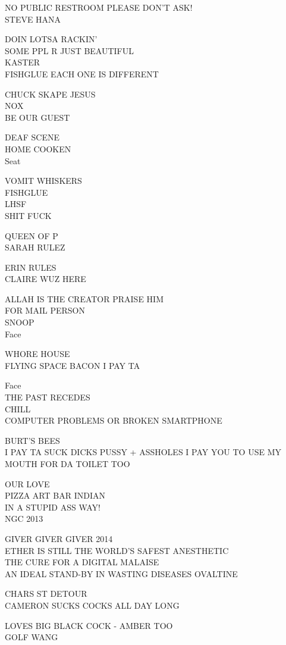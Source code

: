 \documentclass[10pt,letterpaper]{article}
\begin{document}
NO PUBLIC RESTROOM PLEASE DON'T ASK!\\
STEVE HANA

DOIN LOTSA RACKIN'\\
SOME PPL R JUST BEAUTIFUL\\
KASTER\\
FISHGLUE EACH ONE IS DIFFERENT

CHUCK SKAPE JESUS\\
NOX\\
BE OUR GUEST

DEAF SCENE\\
HOME COOKEN\\
Seat

VOMIT WHISKERS\\
FISHGLUE\\
LHSF\\
SHIT FUCK

QUEEN OF P\\
SARAH RULEZ

ERIN RULES\\
CLAIRE WUZ HERE

ALLAH IS THE CREATOR PRAISE HIM\\
FOR MAIL PERSON\\
SNOOP\\
Face

WHORE HOUSE\\
FLYING SPACE BACON I PAY TA

Face\\
THE PAST RECEDES\\
CHILL\\
COMPUTER PROBLEMS OR BROKEN SMARTPHONE

BURT'S BEES\\
I PAY TA SUCK DICKS PUSSY + ASSHOLES I PAY YOU TO USE MY MOUTH FOR DA TOILET TOO

OUR LOVE\\
PIZZA ART BAR INDIAN\\
IN A STUPID ASS WAY!\\
NGC 2013

GIVER GIVER GIVER 2014\\
ETHER IS STILL THE WORLD'S SAFEST ANESTHETIC\\
THE CURE FOR A DIGITAL MALAISE\\
AN IDEAL STAND{-}BY IN WASTING DISEASES OVALTINE

CHARS ST DETOUR\\
CAMERON SUCKS COCKS ALL DAY LONG

LOVES BIG BLACK COCK {-} AMBER TOO\\
GOLF WANG
\end{document}
